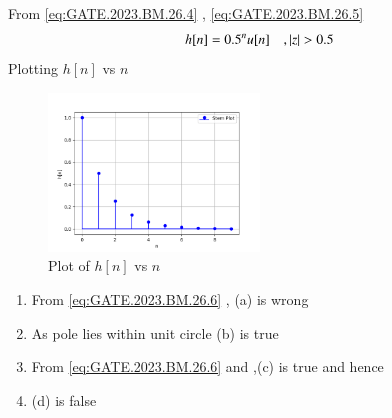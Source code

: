 \documentclass[journal,12pt,twocolumn]{IEEEtran}
\begin{document}
From \eqref{eq:GATE.2023.BM.26.4} , \eqref{eq:GATE.2023.BM.26.5}
\begin{align}
h[n] = 0.5^{n}u[n] \quad , \left\vert z\right\vert > 0.5 \label{eq:GATE.2023.BM.26.6}
\end{align}
\pagebreak 
Plotting $h[n]$ vs $n$
\begin{figure}[h]
    \includegraphics[width=0.5\textwidth]{2023/BM/26/figs/fig1.png}
    \caption{Plot of $h[n]$ vs $n$}
    \label{fig:GATE.2023.BM.26.1}
\end{figure}

\begin{enumerate}
\item From \eqref{eq:GATE.2023.BM.26.6} , (a) is wrong
\item As pole lies within unit circle (b) is true
\item From \eqref{eq:GATE.2023.BM.26.6} and  ,(c) is true and hence
\item (d) is false 
\end{enumerate}





\end{document}
